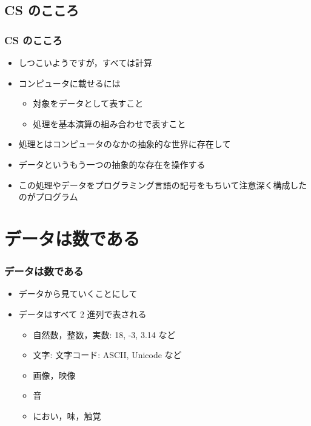 \subsection{CS のこころ}
\begin{frame}
\frametitle{CS のこころ}
  \begin{itemize}
\item しつこいようですが，すべては計算
\item コンピュータに載せるには
    \begin{itemize}
\item 対象をデータとして表すこと
\item 処理を基本演算の組み合わせで表すこと
    \end{itemize}
\item 処理とはコンピュータのなかの抽象的な世界に存在して
\item データというもう一つの抽象的な存在を操作する
\item この処理やデータをプログラミング言語の記号をもちいて注意深く構成したのがプログラム
  \end{itemize}
\end{frame}
%
%
\section{データは数である}
\begin{frame}
\frametitle{データは数である}
  \begin{itemize}
\item データから見ていくことにして
\item データはすべて 2 進列で表される
    \begin{itemize}
\item 自然数，整数，実数: 18, -3, 3.14 など
\item 文字: 文字コード: ASCII, Unicode など
\item 画像，映像
\item 音
\item におい，味，触覚
    \end{itemize}
  \end{itemize}
\end{frame}
%
%
